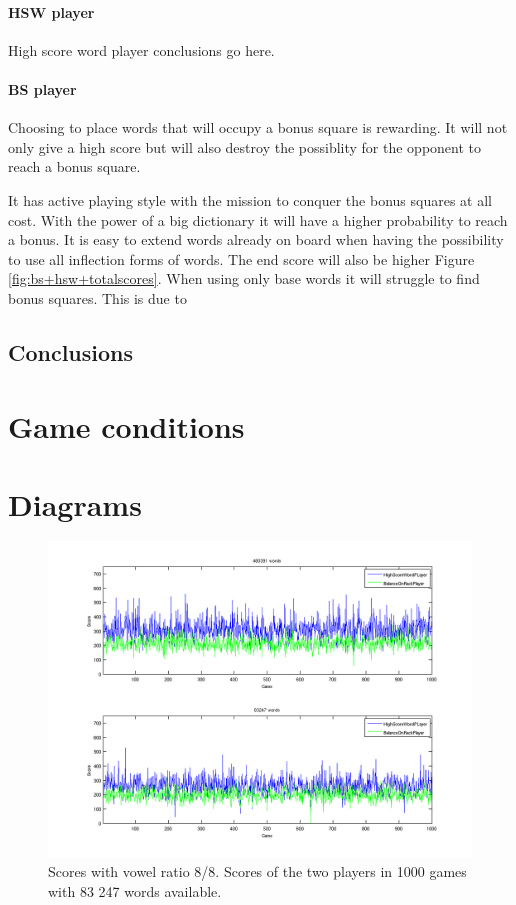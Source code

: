 \documentclass[a4paper, 12pt]{report}
\begin{document}
\subsubsection{HSW player}
High score word player conclusions go here.

\subsubsection{BS player}
Choosing to place words that will occupy a bonus square is rewarding. It will not only give a high score but will also destroy the possiblity for the opponent to reach a bonus square.

It has active playing style with the mission to conquer the bonus squares at all cost. With the power of a big dictionary it will have a higher probability to reach a bonus. It is easy to extend words already on board when having the possibility to use all inflection forms of words. The end score will also be higher Figure \ref{fig:bs+hsw+totalscores}. When using only base words it will struggle to find bonus squares. This is due to 

\section{Conclusions}


\appendix
\chapter{Game conditions}
\graphicspath{{images/}}






\chapter{Diagrams}
\graphicspath{{../results/Plots/}}

\begin{figure}[h]
\centering
\includegraphics[scale=0.5]{HighBalance8vow_bothDict}
\caption {Scores with vowel ratio 8/8. Scores of the two players in 1000 games with 83 247 words available.}
\label{fig:largeDict}
\end{figure}
\end{document}
